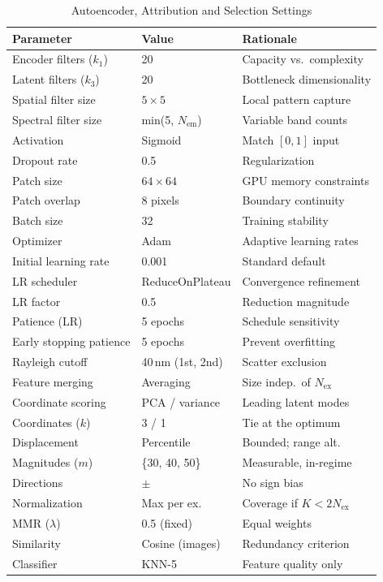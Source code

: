 \begin{table}[!t]
\centering
\caption{Autoencoder, Attribution and Selection Settings}
\label{tab:hyperparams}
\footnotesize
\begin{tabular}{@{}lll@{}}
\toprule
\textbf{Parameter} & \textbf{Value} & \textbf{Rationale} \\
\midrule
Encoder filters ($k_1$) & 20 & Capacity vs.~complexity \\
Latent filters ($k_3$) & 20 & Bottleneck dimensionality \\
Spatial filter size & $5 \times 5$ & Local pattern capture \\
Spectral filter size & min(5, $N_{\text{em}}$) & Variable band counts \\
Activation & Sigmoid & Match $[0,1]$ input \\
Dropout rate & 0.5 & Regularization \\
Patch size & $64 \times 64$ & GPU memory constraints \\
Patch overlap & 8 pixels & Boundary continuity \\
Batch size & 32 & Training stability \\
Optimizer & Adam~\cite{kingma2014adam} & Adaptive learning rates \\
Initial learning rate & 0.001 & Standard default \\
LR scheduler & ReduceOnPlateau & Convergence refinement \\
LR factor & 0.5 & Reduction magnitude \\
Patience (LR) & 5 epochs & Schedule sensitivity \\
Early stopping patience & 5 epochs & Prevent overfitting \\
\midrule
Rayleigh cutoff & 40\,nm (1st, 2nd) & Scatter exclusion \\
Feature merging & Averaging & Size indep.\ of $N_{\text{ex}}$ \\
Coordinate scoring & PCA / variance & Leading latent modes \\
Coordinates ($k$) & 3 / 1 & Tie at the optimum \\
Displacement & Percentile & Bounded; range alt. \\
Magnitudes ($m$) & \{30, 40, 50\} & Measurable, in-regime \\
Directions & $\pm$ & No sign bias \\
Normalization & Max per ex. & Coverage if $K{<}2N_{\text{ex}}$ \\
MMR ($\lambda$) & 0.5 (fixed) & Equal weights~\cite{carbonell1998use} \\
Similarity & Cosine (images) & Redundancy criterion \\
Classifier & KNN-5 & Feature quality only \\
\bottomrule
\end{tabular}
\end{table}

